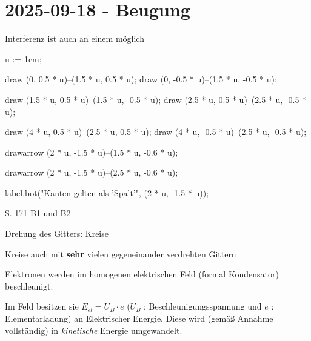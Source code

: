 \section{2025-09-18 - Beugung}

\startitemize[packed]
\item
  Interferenz ist auch an einem  möglich
\stopitemize

\startMPpage

u := 1cm;

draw (0, 0.5 * u)--(1.5 * u, 0.5 * u);
draw (0, -0.5 * u)--(1.5 * u, -0.5 * u);

draw (1.5 * u, 0.5 * u)--(1.5 * u, -0.5 * u);
draw (2.5 * u, 0.5 * u)--(2.5 * u, -0.5 * u);

draw (4 * u, 0.5 * u)--(2.5 * u, 0.5 * u);
draw (4 * u, -0.5 * u)--(2.5 * u, -0.5 * u);

drawarrow (2 * u, -1.5 * u)--(1.5 * u, -0.6 * u);

drawarrow (2 * u, -1.5 * u)--(2.5 * u, -0.6 * u);

label.bot("Kanten gelten als 'Spalt'", (2 * u, -1.5 * u));

\stopMPpage

\stopbuffer
{}

\startsectionlevel[title={Gitterkonstruktion bei
Interferenz},reference={gitterkonstruktion-bei-interferenz}]

\startitemize[packed]
\item
  S. 171 B1 und B2
\stopitemize

Drehung des Gitters: Kreise

Kreise auch mit {\bf sehr} vielen gegeneinander verdrehten Gittern

\stopsectionlevel


\startsectionlevel[title={Versuch:
Elektronenbeugungsröhre},reference={versuch-elektronenbeugungsröhre}]

\startdefinition[title={Berechnung geschwindigkeite von Elektronen in der Elektronenkanone}]

Elektronen werden im homogenen elektrischen Feld (formal Kondensator)
beschleunigt.

Im Feld besitzen sie $E_{el}=U_B \cdot e$ ($U_B$ :
Beschleunigungsspannung und $e$ : Elementarladung) an Elektrischer
Energie. Diese wird (gemäß Annahme vollständig) in {\em kinetische}
Energie umgewandelt.

